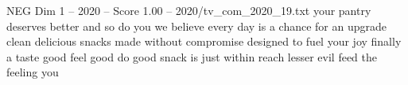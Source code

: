 \begin{textsample}{NEG Dim 1 – 2020 – Score 1.00 – 2020/tv\_com\_2020\_19.txt}  \label{ex:f1_neg_015}
your pantry deserves better and so do you we believe every day is a chance for an upgrade clean delicious snacks made without compromise designed to fuel your joy finally a taste good feel good do good snack is just within reach lesser evil feed the feeling you

\end{textsample}

